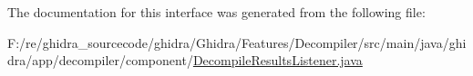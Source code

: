The documentation for this interface was generated from the following file\+:\begin{DoxyCompactItemize}
\item 
F\+:/re/ghidra\+\_\+sourcecode/ghidra/\+Ghidra/\+Features/\+Decompiler/src/main/java/ghidra/app/decompiler/component/\mbox{\hyperlink{_decompile_results_listener_8java}{Decompile\+Results\+Listener.\+java}}\end{DoxyCompactItemize}
